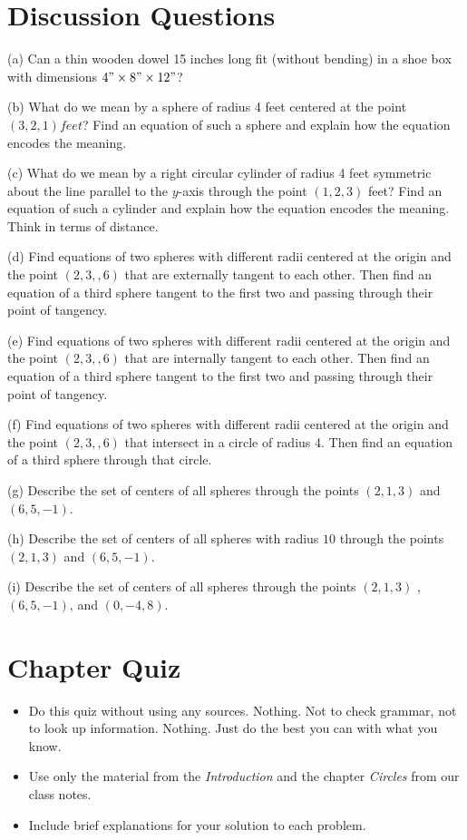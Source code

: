 \documentclass{ximera}
\begin{document}
\section{Discussion Questions}

\begin{question} \label{Q4934:Space}
(a) Can a thin wooden dowel 15 inches long fit (without bending) in a shoe box with dimensions $4"\times 8"\times 12"$?

(b) What do we mean by a sphere of radius 4 feet centered at the point $(3,2,1) feet$? Find an equation of such a sphere and explain how the equation encodes the meaning.

(c) What do we mean by a right circular cylinder of radius 4 feet symmetric about the line parallel to the $y$-axis through the point $(1,2,3)$ feet? Find an equation of such a cylinder and explain how the equation encodes the meaning. Think in terms of distance.

(d) Find equations of two spheres with different radii centered at the origin and the point $(2,3,,6)$ that are externally tangent to each other. Then find an equation of a third sphere tangent to the first two and passing through their point of tangency.

(e) Find equations of two spheres with different radii centered at the origin and the point $(2,3,,6)$ that are internally tangent to each other. Then find an equation of a third sphere tangent to the first two and passing through their point of tangency.

(f) Find equations of two spheres with different radii centered at the origin and the point $(2,3,,6)$ that intersect in a circle of radius 4. Then find an equation of a third sphere through that circle.

(g) Describe the set of centers of all spheres through the points $(2,1,3)$ and $(6,5,-1)$.

(h) Describe the set of centers of all spheres with radius $10$ through the points $(2,1,3)$ and $(6,5,-1)$.

(i) Describe the set of centers of all spheres through the points $(2,1,3)$ , $(6,5,-1)$, and $(0,-4,8)$.

\end{question}


\section*{Chapter Quiz}

\begin{itemize}

\item{Do this quiz without using any sources. Nothing. Not to check grammar, not to look up information. Nothing. Just do the best you can with what you know.}

\item{Use only the material from the \emph{Introduction} and the chapter \emph{Circles} from our class notes.}

\item{Include brief explanations for your solution to each problem.}

\end{itemize}
\end{document}
